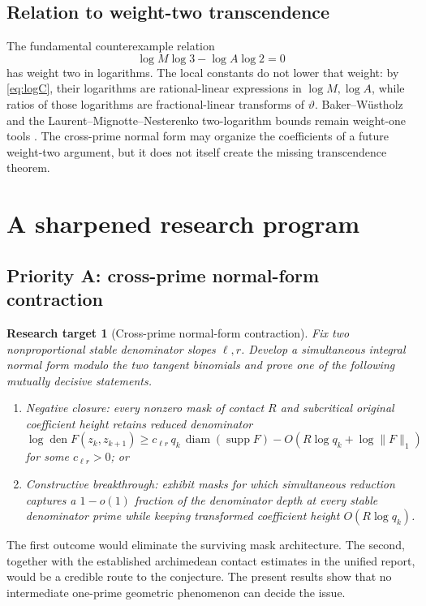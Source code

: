 \documentclass[11pt,oneside]{article}
\newtheorem{target}[theorem]{Research target}
\theoremstyle{definition}
\theoremstyle{remark}
\newcommand{\thetaq}{\vartheta}
\newcommand{\supp}{\operatorname{supp}}
\newcommand{\den}{\operatorname{den}}
\begin{document}
\subsection{Relation to weight-two transcendence}

The fundamental counterexample relation
\[
 \log M\log3-\log A\log2=0
\]
has weight two in logarithms.  The local constants do not lower that weight: by
\eqref{eq:logC}, their logarithms are rational-linear expressions in $\log M,\log A$, while
ratios of those logarithms are fractional-linear transforms of $\thetaq$.  Baker--W\"ustholz
and the Laurent--Mignotte--Nesterenko two-logarithm bounds remain weight-one tools
\cite{BakerWustholz1993,LaurentMignotteNesterenko}.  The cross-prime normal form may organize
the coefficients of a future weight-two argument, but it does not itself create the missing
transcendence theorem.

\section{A sharpened research program}
\label{sec:program}

\subsection{Priority A: cross-prime normal-form contraction}

\begin{target}[Cross-prime normal-form contraction]
\label{target:cross-prime-contraction}
Fix two nonproportional stable denominator slopes $\ell,r$.  Develop a simultaneous integral
normal form modulo the two tangent binomials and prove one of the following mutually decisive
statements.
\begin{enumerate}
\item \emph{Negative closure:} every nonzero mask of contact $R$ and subcritical original
coefficient height retains reduced denominator
\[
 \log\den F(z_k,z_{k+1})
 \ge c_{\ell r}\,q_k\,\operatorname{diam}(\supp F)
   -O(R\log q_k+\log\lVert F\rVert_1)
\]
for some $c_{\ell r}>0$; or
\item \emph{Constructive breakthrough:} exhibit masks for which simultaneous reduction
captures a $1-o(1)$ fraction of the denominator depth at every stable denominator prime while
keeping transformed coefficient height $O(R\log q_k)$.
\end{enumerate}
\end{target}

The first outcome would eliminate the surviving mask architecture.  The second, together
with the established archimedean contact estimates in the unified report, would be a credible
route to the conjecture.  The present results show that no intermediate one-prime geometric
phenomenon can decide the issue.
\end{document}

